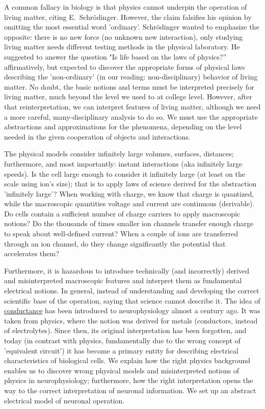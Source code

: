 A common fallacy in biology is that \hypertarget{Physics}{physics} cannot underpin the operation of living matter, citing E.~Schrödinger. However, the claim falsifies his opinion by omitting the most essential word 'ordinary'. 
Schrödinger wanted to emphasize the opposite: there is no new force (no unknown new interaction), only studying living matter needs different testing methods in the physical laboratory. He suggested to answer the question
"Is life based on the laws of physics?” affirmatively, but expected to discover the appropriate forms of physical laws describing the 'non-ordinary' (in our reading: non-disciplinary) behavior of living matter. No doubt, the basic notions and terms must be interpreted precisely for living matter,
much beyond the level we used to at college level.
However, after that reinterpretation, we can interpret features of living matter, although we need a more careful, many-disciplinary analysis to do so. 
We must use the appropriate abstractions and approximations for the phenomena,
depending on the level needed in the given cooperation of objects and interactions.

{
The physical models consider infinitely large volumes,
surfaces, distances; furthermore, and most importantly: instant interactions (aka infinitely large speeds). Is the cell large enough to
consider it infinitely large (at least on the scale using ion's size); that is to apply laws of science
derived for the abstraction 'infinitely large'? 
When working with charge, we know that charge is quantized, while the macroscopic quantities voltage and current are 
continuous (derivable). Do cells contain a sufficient 
number of charge carriers to apply macroscopic notions?
Do the thousands of times smaller ion channels transfer enough charge
to speak about well-defined current?
When a couple of ions are transferred through an ion channel,
do they change significantly the potential that accelerates them?



Furthermore, it is hazardous to introduce technically (and incorrectly) derived
and misinterpreted macroscopic features and interpret them as fundamental
electrical notions. In general, instead of understanding and developing the correct scientific base of the operation, saying that science cannot describe it. The idea of
\hyperlink{electric_conductance}
{conductance}
has been introduced
to neurophysiology almost a century ago. It was taken from physics, where the
notion was derived for metals (conductors, instead of electrolytes). Since then, its original interpretation
has been forgotten, and today (in contrast with physics,
 fundamentally due to the wrong concept of 'equivalent circuit') it has become
a primary entity for describing electrical characteristics of biological
cells. We explain how the right physics background enables us to
discover wrong physical models and 
misinterpreted notions of physics in neurophysiology;
furthermore, how the right interpretation opens the way to the correct interpretation
of neuronal information. We set up an abstract electrical model of neuronal
operation.
}


